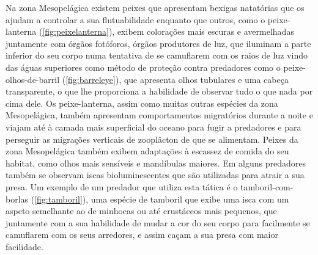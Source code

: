 \documentclass{report}
\begin{document}
Na zona Mesopelágica existem peixes que apresentam  bexigas natatórias que os ajudam a controlar a sua flutuabilidade enquanto que outros, como o peixe-lanterna (\ref{fig:peixelanterna}), exibem colorações mais escuras e avermelhadas juntamente com órgãos fotóforos, órgãos produtores de luz, que iluminam a parte inferior do seu corpo numa tentativa de se camuflarem com os raios de luz vindo das águas superiores como método de proteção contra predadores como o peixe-olhos-de-barril (\ref{fig:barreleye}), que apresenta olhos tubulares e uma cabeça transparente, o que lhe proporciona a habilidade de observar tudo o que nada por cima dele.
Os peixe-lanterna, assim como muitas outras espécies da zona Mesopelágica, também apresentam comportamentos migratórios durante a noite e viajam até à camada mais superficial do oceano para fugir a predadores e para perseguir as migrações verticais de zooplâcton de que se alimentam.
Peixes da zona Mesopelágica também exibem adaptações à escassez de comida do seu habitat, como olhos mais sensíveis e mandíbulas maiores. Em alguns predadores também se observam iscas bioluminescentes que são utilizadas para atrair a sua presa. Um exemplo de um predador que utiliza esta tática é o tamboril-com-borlas (\ref{fig:tamboril}), uma espécie de tamboril que exibe uma isca com um aspeto semelhante ao de minhocas ou até crustáceos mais pequenos, que juntamente com a sua habilidade de mudar a cor do seu corpo para facilmente se camuflarem com os seus arredores, e assim caçam a sua presa com maior facilidade.
\\
\end{document}
